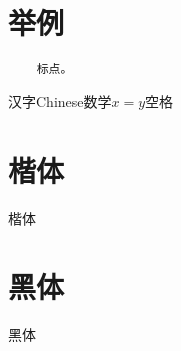 \documentclass[11pt]{article}
\begin{document}
	\section{举例}
	\begin{verbatim}           
	标点。                              
	\end{verbatim}
	
	汉字Chinese数学$x=y$空格
	
	\section{楷体}  
	
	\kai 楷体
	
	\section{黑体}  
	
	\hei 黑体
	
\end{document}

